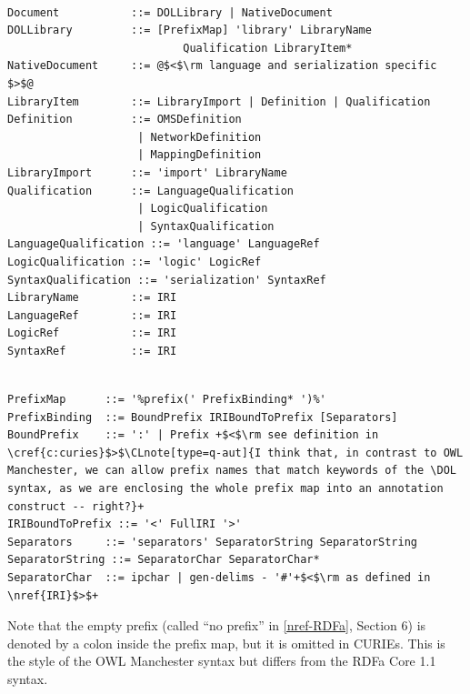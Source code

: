 \documentclass[10pt, a4paper]{isov2}
\makeatletter
\newcommand*\CommentAuthor{}
\renewcommand*\CommentAuthor{#1}}
\newcommand*\CommentDate{}
\renewcommand*\CommentDate{#1}}
\newcommand*\CommentId{}
\renewcommand*\CommentId{#1}}
\newcommand*\CommentType{}
\renewcommand*\CommentType{#1}}
\newcommand*{\SetCommentColorByType}[1]{%
\edef\localType{{#1}}%
\expandafter\ifstrequal\localType{q-aut}{\colorlet{CommentColor}{red}}{%
\expandafter\ifstrequal\localType{q-all}{\colorlet{CommentColor}{orange}}{%
\expandafter\ifstrequal\localType{todo}{\colorlet{CommentColor}{orange}}{%
\expandafter\ifstrequal\localType{fyi}{\colorlet{CommentColor}{lightgray}}{%
\colorlet{CommentColor}{yellow}}}}}}
\newcommand*{\SetCommentPrefixByType}[1]{%
\edef\localType{{#1}}%
\expandafter\@ifmtarg\localType{%
\edef\CommentPrefix{}%
}{%
\caseupper[q]{#1}%
\edef\CommentPrefix{\thestring: }%
}}
\newcommand*{\initComment}[1]{%
\setkeys{Comment}{#1}%
\SetCommentColorByType{\CommentType}%
\relax%
\SetCommentPrefixByType{\CommentType}%
\relax%
}
\newcommand*{\todonote}[2][]{%
\initComment{#1}%
\pdfcomment[author=\CommentAuthor,color=CommentColor,date=\CommentDate,id=\CommentId]{%
\CommentPrefix
#2}}
\renewcommand*{\todonote}[2][]{%
\initComment{#1}%
\ednote{\CommentPrefix #2}}
\newcommand*{\CLnote}[2][author=Christoph Lange]{%
\todonote[author=Christoph Lange,#1]{#2}}
\newcommand*{\DOL}{\ensuremath{\mathsf{DOL}}\xspace}
\renewcommand{\clauserefname}{clause}
\renewcommand{\noterefname}{note}
\renewcommand{\cref}[1]{\clauserefname~\ref{#1}}
\renewcommand{\nref}[1]{\noterefname~\ref{#1}}
\renewcommand{\nref}[1]{\ref{nref-#1}}
\makeatother
\begin{document}
\begin{lstlisting}[language=ebnf,escapeinside={@@},morecomment={[l]{\%\%\ }}]

Document           ::= DOLLibrary | NativeDocument
DOLLibrary         ::= [PrefixMap] 'library' LibraryName
                           Qualification LibraryItem*
NativeDocument     ::= @$<$\rm language and serialization specific $>$@
LibraryItem        ::= LibraryImport | Definition | Qualification
Definition         ::= OMSDefinition
                    | NetworkDefinition
                    | MappingDefinition
LibraryImport      ::= 'import' LibraryName
Qualification      ::= LanguageQualification
                    | LogicQualification
                    | SyntaxQualification
LanguageQualification ::= 'language' LanguageRef
LogicQualification ::= 'logic' LogicRef
SyntaxQualification ::= 'serialization' SyntaxRef
LibraryName        ::= IRI
LanguageRef        ::= IRI
LogicRef           ::= IRI
SyntaxRef          ::= IRI
\end{lstlisting}


\begin{lstlisting}[language=ebnf,escapechar=+,morecomment={[l]{\%\%\ }}]

PrefixMap      ::= '%prefix(' PrefixBinding* ')%'
PrefixBinding  ::= BoundPrefix IRIBoundToPrefix [Separators]
BoundPrefix    ::= ':' | Prefix +$<$\rm see definition in \cref{c:curies}$>$\CLnote[type=q-aut]{I think that, in contrast to OWL Manchester, we can allow prefix names that match keywords of the \DOL syntax, as we are enclosing the whole prefix map into an annotation construct -- right?}+
IRIBoundToPrefix ::= '<' FullIRI '>'
Separators     ::= 'separators' SeparatorString SeparatorString
SeparatorString ::= SeparatorChar SeparatorChar*
SeparatorChar  ::= ipchar | gen-delims - '#'+$<$\rm as defined in \nref{IRI}$>$+
\end{lstlisting}


 Note that the empty prefix (called ``no prefix'' in \nref{RDFa}, Section 6) is denoted by a colon inside the prefix map, but it is omitted in CURIEs.  This is the style of the OWL Manchester syntax \cite{W3C:owl2-manchester-syntax} but differs from the RDFa Core 1.1 syntax.

\vspace{1em}



\end{document}
